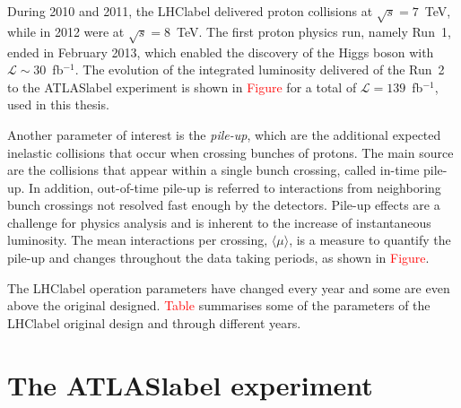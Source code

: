 During 2010 and 2011, the \acrshort{LHClabel} delivered proton collisions at $\sqrt{s}=7$~TeV, while in 2012 were at $\sqrt{s}=8$~TeV. The first proton physics run, namely Run~1, ended in February 2013, which enabled the discovery of the Higgs boson with $\mathscr{L}\sim30$~fb$^{-1}$. The evolution of the integrated luminosity delivered of the Run~2 to the \acrshort{ATLASlabel} experiment is shown in \textcolor{red}{Figure} for a total of $\mathscr{L}=139$~fb$^{-1}$, used in this thesis.

Another parameter of interest is the \textit{pile-up}, which are the additional expected inelastic collisions that occur when crossing bunches of protons. The main source are the collisions that appear within a single bunch crossing, called in-time pile-up. In addition, out-of-time pile-up is referred to interactions from neighboring bunch crossings not resolved fast enough by the detectors. Pile-up effects are a challenge for physics analysis and is inherent to the increase of instantaneous luminosity. The mean interactions per crossing, $\langle\mu\rangle$, is a measure to quantify the pile-up and changes throughout the data taking periods, as shown in \textcolor{red}{Figure}.

The \acrshort{LHClabel} operation parameters have changed every year and some are even above the original designed. \textcolor{red}{Table} summarises some of the parameters of the \acrshort{LHClabel} original design and through different years.



\section{The \acrshort{ATLASlabel} experiment}

